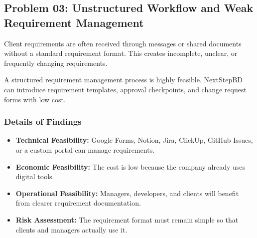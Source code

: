 \documentclass[12pt,a4paper]{report}
\begin{document}
\subsection{Problem 03: Unstructured Workflow and Weak Requirement Management}

\begin{problemBox}
Client requirements are often received through messages or shared documents without a standard requirement format. This creates incomplete, unclear, or frequently changing requirements.
\end{problemBox}

\begin{summaryBox}
A structured requirement management process is highly feasible. NextStepBD can introduce requirement templates, approval checkpoints, and change request forms with low cost.
\end{summaryBox}

\subsubsection{Details of Findings}

\begin{itemize}[leftmargin=*]
    \item \textbf{Technical Feasibility:} Google Forms, Notion, Jira, ClickUp, GitHub Issues, or a custom portal can manage requirements.
    \item \textbf{Economic Feasibility:} The cost is low because the company already uses digital tools.
    \item \textbf{Operational Feasibility:} Managers, developers, and clients will benefit from clearer requirement documentation.
    \item \textbf{Risk Assessment:} The requirement format must remain simple so that clients and managers actually use it.
\end{itemize}
\end{document}
